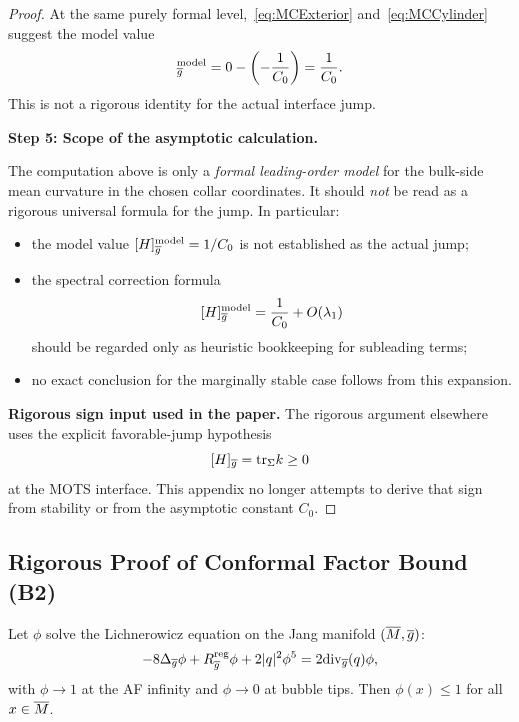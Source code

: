\begin{proof}
At the same purely formal level,~\eqref{eq:MCExterior} and~\eqref{eq:MCCylinder} suggest the model value
\begin{equation}
    [H]_{\bg}^{\mathrm{model}} = 0 - \left( -\frac{1}{C_0} \right) = \frac{1}{C_0}.
\end{equation}
This is not a rigorous identity for the actual interface jump.

\textbf{Step 5: Scope of the asymptotic calculation.}

The computation above is only a \textit{formal leading-order model} for the bulk-side mean curvature in the chosen collar coordinates. It should \emph{not} be read as a rigorous universal formula for the jump. In particular:
\begin{itemize}
    \item the model value $[H]_{\overline{g}}^{\mathrm{model}} = 1/C_0$ is not established as the actual jump;
    \item the spectral correction formula
    \begin{equation}\label{eq:MCJumpStability}
        [H]_{\overline{g}}^{\mathrm{model}} = \frac{1}{C_0} + O(\lambda_1)
    \end{equation}
    should be regarded only as heuristic bookkeeping for subleading terms;
    \item no exact conclusion for the marginally stable case follows from this expansion.
\end{itemize}

\textbf{Rigorous sign input used in the paper.}
The rigorous argument elsewhere uses the explicit favorable-jump hypothesis
\[
    [H]_{\overline{g}} = \mathrm{tr}_\Sigma k \ge 0
\]
at the MOTS interface. This appendix no longer attempts to derive that sign from stability or from the asymptotic constant $C_0$.
\end{proof}

\subsection{Rigorous Proof of Conformal Factor Bound (B2)}

\begin{theorem}\label{thm:PhiBoundComplete}
Let $\phi$ solve the Lichnerowicz equation on the Jang manifold $(\overline{M}, \overline{g})$:
\begin{equation}\label{eq:LichFull}
    -8\Delta_{\overline{g}} \phi + R_{\overline{g}}^{\text{reg}} \phi + 2|q|^2 \phi^5 = 2\mathrm{div}_{\overline{g}}(q) \phi,
\end{equation}
with $\phi \to 1$ at the AF infinity and $\phi \to 0$ at bubble tips. Then $\phi(x) \le 1$ for all $x \in \overline{M}$.
\end{theorem}

